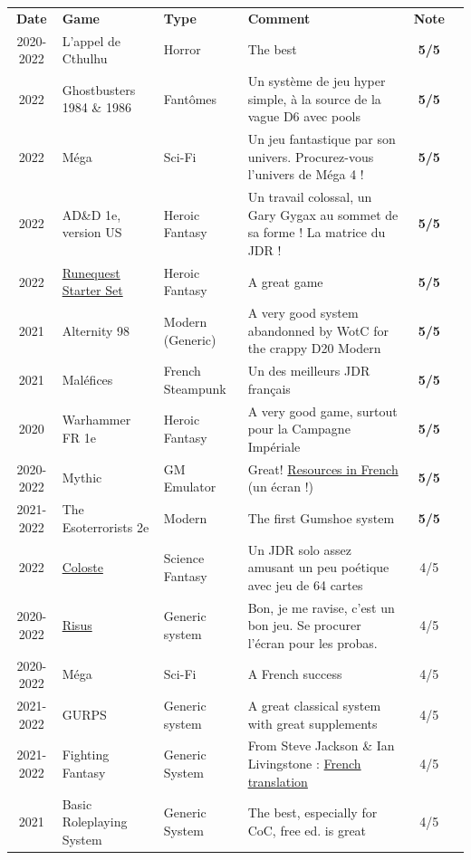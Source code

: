 \documentclass[a4paper, 11pt, twoside]{article}
\begin{document}
\begin{longtable}{cp{2cm}p{1.5cm}p{7cm}cc}
\textbf{Date} & \textbf{Game} & \textbf{Type} & \textbf{Comment} & \textbf{Note}\\
2020-2022 & L'appel de Cthulhu & Horror & The best & \textbf{5/5}\\
2022 & Ghostbusters 1984 \& 1986 & Fantômes & Un système de jeu hyper simple, à la source de la vague D6 avec pools & \textbf{5/5}\\
2022 & Méga & Sci-Fi & Un jeu fantastique par son univers. Procurez-vous l'univers de Méga 4 ! & \textbf{5/5}\\
2022 & AD\&D 1e, version US & Heroic Fantasy & Un travail colossal, un Gary Gygax au sommet de sa forme ! La matrice du JDR ! & \textbf{5/5}\\
2022 & \href{https://www.chaosium.com/runequest-starter-set/}{Runequest Starter Set} & Heroic Fantasy & A great game & \textbf{5/5}\\
2021 & Alternity 98 & Modern (Generic) & A very good system abandonned by WotC for the crappy D20 Modern & \textbf{5/5}\\
2021 & Maléfices & French Steampunk & Un des meilleurs JDR français & \textbf{5/5}\\
2020 & Warhammer FR 1e & Heroic Fantasy & A very good game, surtout pour la Campagne Impériale & \textbf{5/5}\\
2020-2022 & Mythic & GM Emulator & Great! \href{https://github.com/orey/jdr/tree/master/Mythic-fr}{Resources in French} (un écran !) & \textbf{5/5}\\
2021-2022 & The Esoterrorists 2e & Modern & The first Gumshoe system & \textbf{5/5}\\
2022 & \href{https://www.colostle.com/}{Coloste} & Science Fantasy & Un JDR solo assez amusant un peu poétique avec jeu de 64 cartes & 4/5\\
2020-2022 & \href{https://github.com/orey/jdr-risus}{Risus} & Generic system & Bon, je me ravise, c'est un bon jeu. Se procurer l'écran pour les probas. & 4/5\\
2020-2022 & Méga & Sci-Fi & A French success & 4/5\\
2021-2022 & GURPS & Generic system & A great classical system with great supplements & 4/5\\
2021-2022 & Fighting Fantasy & Generic System & From Steve Jackson \& Ian Livingstone : \href{https://github.com/orey/jdr/tree/master/FightingFantasys-fr}{French translation} & 4/5\\
2021 & Basic Roleplaying System & Generic System & The best, especially for CoC, free ed. is great & 4/5\\

\end{longtable}
\end{document}

